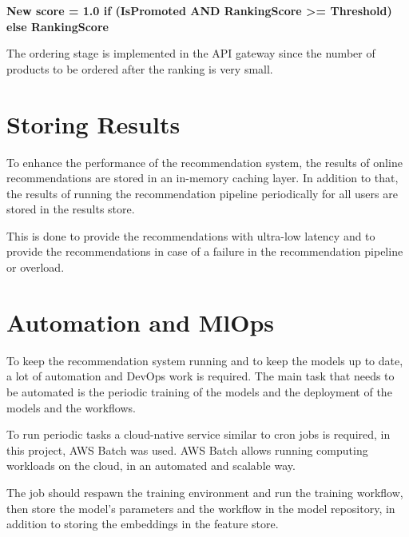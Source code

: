\textbf{New score = { 1.0  if (IsPromoted AND RankingScore >= Threshold) else RankingScore }}

The ordering stage is implemented in the API gateway since the number of products to be ordered after the ranking is very small.


\section{Storing Results}

To enhance the performance of the recommendation system, the results of online recommendations are stored in an in-memory caching layer.
In addition to that, the results of running the recommendation pipeline periodically for all users are stored in the results store.

This is done to provide the recommendations with ultra-low latency and to provide the recommendations in case of a failure in the recommendation pipeline or overload.

\section{Automation and MlOps}

To keep the recommendation system running and to keep the models up to date, a lot of automation and DevOps work is required.
The main task that needs to be automated is the periodic training of the models and the deployment of the models and the workflows.

To run periodic tasks a cloud-native service similar to cron jobs is required, in this project, AWS Batch \cite{AwsBatch} was used.
AWS Batch allows running computing workloads on the cloud, in an automated and scalable way.

The job should respawn the training environment and run the training workflow, then store the model's parameters and the workflow in the model repository, in addition to storing the embeddings in the feature store.